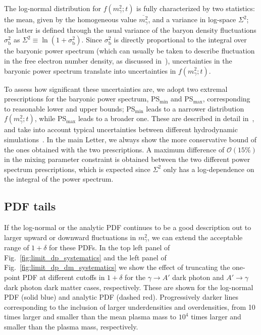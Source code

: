 \documentclass[prd,aps,10pt,nofootinbib,twocolumn,superscriptaddress,preprintnumbers,balancelastpage,longbibliography]{revtex4-1}
\begin{document}
The log-normal distribution for $f(m_\gamma^2;t)$ is fully characterized by two statistics: the mean, given by the homogeneous value $\overline{m_\gamma^2}$, and a variance in log-space $\Sigma^2$; the latter is defined through the usual variance of the baryon density fluctuations $\sigma_\text{b}^2$ as $\Sigma^2 \equiv \ln(1 + \sigma_\text{b}^2)$. Since $\sigma_\text{b}^2$ is directly proportional to the integral over the baryonic power spectrum (which can usually be taken to describe fluctuation in the free electron number density, as discussed in~), uncertainties in the baryonic power spectrum translate  into uncertainties in $f(m_\gamma^2;t)$.

To assess how significant these uncertainties are, we adopt two extremal prescriptions for the baryonic power spectrum, PS$_{\min}$ and PS$_{\max}$, corresponding to reasonable lower and upper bounds; PS$_{\min}$ leads to a narrower distribution $f(m_\gamma^2;t)$, while PS$_{\max}$ leads to a broader one. These are described in detail in~, and take into account typical uncertainties between different hydrodynamic simulations~\cite{Nelson:2018uso,McAlpine:2015tma,McCarthy:2016mry,Genel:2014lma}. In the main Letter, we always show the more conservative bound of the ones obtained with the two prescriptions. A maximum difference of $\mathcal O (15\%)$ in the mixing parameter constraint is obtained between the two different power spectrum prescriptions, which is expected since $\Sigma^2$ only has a log-dependence on the integral of the power spectrum.

\subsection{PDF tails}

If the log-normal or the analytic PDF continues to be a good description out to larger upward or downward fluctuations in $m_\gamma^2$, we can extend the acceptable range of $1+\delta$ for these PDFs. In the top left panel of Fig.~\ref{fig:limit_dp_systematics} and the left panel of Fig.~\ref{fig:limit_dp_dm_systematics} we show the effect of truncating the one-point PDF at different cutoffs in $1 + \delta$ for the $\gamma\to A'$ dark photon and $A' \to \gamma$ dark photon dark matter cases, respectively. These are shown for the log-normal PDF (solid blue) and analytic PDF (dashed red). Progressively darker lines corresponding to the inclusion of larger underdensities and overdensities, from 10 times larger and smaller than the mean plasma mass to $10^4$ times larger and smaller than the plasma mass, respectively.
\end{document}

